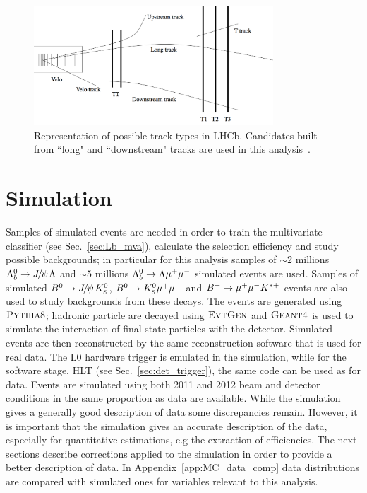 \begin{figure}[hbt]
\centering
\includegraphics[width=0.8\textwidth,trim=0cm 0cm 0cm 5mm,]{Lmumu/figs/track_types.png}
\caption{Representation of possible track types in LHCb. Candidates built from ``long" and 
``downstream" tracks are used in this analysis~\cite{Alves:2008zz}.}
\label{fig:track_types}
\end{figure}
 
\section{Simulation}
\label{sec:Lb_simulation}

Samples of simulated events are needed in order to train the multivariate classifier
(see Sec.~\ref{sec:Lb_mva}), calculate the selection efficiency and study possible backgrounds;
in particular for this analysis samples of $\sim 2$ millions $\Lb\to\jpsi\Lz$ and 
$\sim 5$ millions ${{\Lambda}^0_{b}}\rightarrow{\ensuremath{\Lambda}}{\ensuremath{\mu^+\mu^-}}$ simulated events are used.
Samples of simulated $\Bz\ra\jpsi\KS$, ${{B}^0}\rightarrow{\ensuremath{{K}^0_{\rm\scriptscriptstyle S}}}{\ensuremath{\mu^+\mu^-}}$ and $B^{+} \rightarrow{\ensuremath{\mu^+\mu^-}} K^{*+}$
events are also used to study backgrounds from these decays. The events are generated using
$\textsc{Pythia}8$; hadronic particle are decayed using $\textsc{EvtGen}$ and $\textsc{Geant4}$ is used to simulate
the interaction of final state particles with the detector. Simulated events are then
reconstructed by the same reconstruction software that is used for real data. The L0 hardware
trigger is emulated in the simulation, while for the software stage, HLT
(see Sec.~\ref{sec:det_trigger}), the same code can be used as for data.
Events are simulated using both 2011 and 2012 beam and detector conditions in the same proportion as
data are available. While the simulation gives a generally good description of data some discrepancies remain.
However, it is important that the simulation gives an accurate description of the data, 
especially for quantitative estimations, e.g the extraction of efficiencies. The next sections
describe corrections applied to the simulation in order to provide a better description of data.
In Appendix~\ref{app:MC_data_comp} data distributions are compared with simulated ones for
variables relevant to this analysis.


